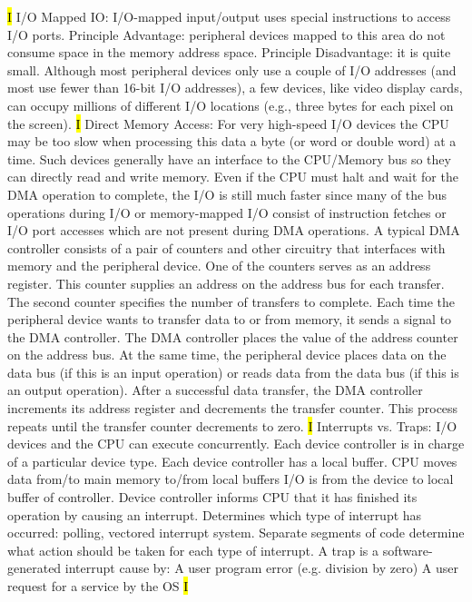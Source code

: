 \documentclass[fontsize=4pt]{scrartcl}
\begin{document}
\hl{I}
I/O Mapped IO: I/O-mapped input/output uses special instructions to access I/O ports. Principle  Advantage: peripheral devices mapped to this area do not consume space in the memory address space. Principle Disadvantage:  it is quite small.
Although most peripheral devices only use a couple of I/O addresses (and most use fewer than 16-bit  I/O addresses), a few devices, like video display cards, can occupy millions of different I/O locations (e.g., three bytes for each pixel on the screen).
\hl{I}
Direct Memory Access: For very high-speed I/O devices the CPU may be too slow when processing this data a byte (or word or double word) at a time. Such devices generally have an interface to the CPU/Memory bus so they can directly read and write memory. Even if the CPU must halt and wait for the DMA operation to complete, the I/O is still much faster since many of the bus operations during I/O or memory-mapped I/O consist of instruction fetches or I/O port accesses which are not present during DMA operations. A typical DMA controller consists of a pair of counters and other circuitry that interfaces with memory and the peripheral device.
One of the counters serves as an address register. This counter supplies an address on the address bus for each transfer. The second counter specifies the number of transfers to complete. Each time the peripheral device wants to transfer data to or from memory, it sends a signal to the DMA controller. The DMA controller places the value of the address counter on the address bus.
At the same time, the peripheral device places data on the data bus (if this is an input operation) or reads data from the data bus (if this is an output operation). After a successful data transfer, the DMA controller increments its address register and decrements the transfer counter. This process repeats until the transfer counter decrements to zero. 
\hl{I}
Interrupts vs. Traps: I/O devices and the CPU can execute concurrently. Each device controller is in charge of a particular device type. Each device controller has a local buffer. CPU moves data from/to main memory to/from local buffers I/O is from the device to local buffer of controller. Device controller informs CPU that it has finished its operation by causing an interrupt. Determines which type of interrupt has occurred: polling, vectored interrupt system. Separate segments of code determine what action should be taken for each type of interrupt. A trap is a software-generated interrupt cause by: A user program error (e.g. division by zero) A user request for a service by the OS
\hl{I}
\end{document}
